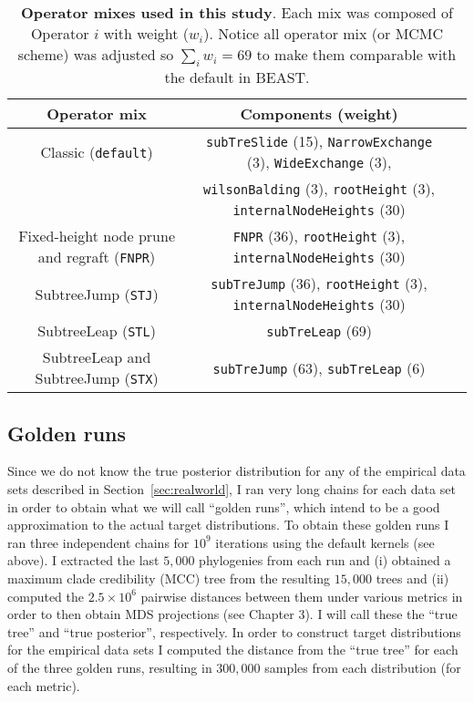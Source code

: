 \begin{sidewaystable}[!ht]
\caption[Operator mixes used in this study.]{\textbf{Operator mixes used in this study}.
Each mix was composed of Operator $i$ with weight ($w_i$).
Notice all operator mix (or MCMC scheme) was adjusted so $\sum_i w_i = 69$ to make them comparable with the default in BEAST.
}
\begin{center}
\begin{tabular}{ccc}
\toprule
Operator mix &  Components (weight) \\             
\midrule
Classic (\verb|default|) &  \verb|subTreSlide| (15), \verb|NarrowExchange| (3), \verb|WideExchange| (3), \\ &  \verb|wilsonBalding| (3), \verb|rootHeight| (3), \verb|internalNodeHeights| (30) \\
Fixed-height node prune and regraft (\verb|FNPR|) &  \verb|FNPR| (36), \verb|rootHeight| (3), \verb|internalNodeHeights| (30) \\
SubtreeJump  (\verb|STJ|) &  \verb|subTreJump| (36), \verb|rootHeight| (3), \verb|internalNodeHeights| (30)\\
SubtreeLeap (\verb|STL|) &  \verb|subTreLeap| (69)\\
SubtreeLeap and SubtreeJump (\verb|STX|) & \verb|subTreJump| (63), \verb|subTreLeap| (6) \\
\bottomrule
\end{tabular}
\end{center}
 \label{tab:operator_mixes}
\end{sidewaystable}

\subsection{Golden runs}
\label{sec:golden_runs}

Since we do not know the true posterior distribution for any of the empirical data sets described in Section~\ref{sec:realworld}, I ran very long chains for each data set in order to obtain what we will call ``golden runs'', which intend to be a good approximation to the actual target distributions.
To obtain these golden runs I ran three independent chains for $10^9$ iterations using the default kernels (see above).
I extracted the last $5, 000$ phylogenies from each run and (i) obtained a maximum clade credibility (MCC) tree from the resulting $15, 000$ trees and (ii) computed the $2.5 \times 10^6$ pairwise distances between them under various metrics in order to then obtain MDS projections (see Chapter 3).
I will call these the ``true tree'' and ``true posterior'', respectively.
In order to construct target distributions for the empirical data sets I computed the distance from the ``true tree'' for each of the three golden runs, resulting in $300, 000$  samples from each distribution (for each metric).

